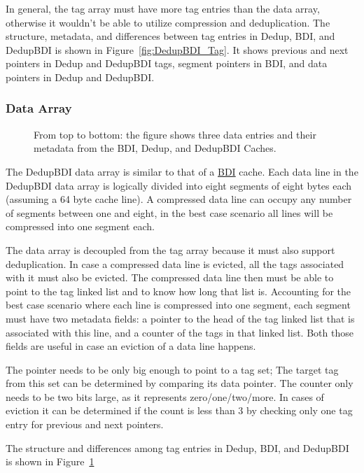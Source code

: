 In general, the tag array must have more tag entries than the data array, otherwise it wouldn't be able to utilize compression and deduplication. The structure, metadata, and differences between tag entries in Dedup, BDI, and DedupBDI is shown in Figure~\ref{fig:DedupBDI_Tag}. It shows previous and next pointers in Dedup and DedupBDI tags, segment pointers in BDI, and data pointers in Dedup and DedupBDI.
\subsubsection{Data Array}
\label{sssec:DedupBDIData}
\begin{figure}
    \caption[DedupBDI Data Array]{From top to bottom: the figure shows three data entries and their metadata from the BDI, Dedup, and DedupBDI Caches.}
    \label{fig:DedupBDI_Data}
\end{figure}
The DedupBDI data array is similar to that of a \hyperref[sssec:BDIData]{BDI} cache. Each data line in the DedupBDI data array is logically divided into eight segments of eight bytes each (assuming a 64 byte cache line). A compressed data line can occupy any number of segments between one and eight, in the best case scenario all lines will be compressed into one segment each.\par
The data array is decoupled from the tag array because it must also support deduplication. In case a compressed data line is evicted, all the tags associated with it must also be evicted. The compressed data line then must be able to point to the tag linked list and to know how long that list is. Accounting for the best case scenario where each line is compressed into one segment, each segment must have two metadata fields: a pointer to the head of the tag linked list that is associated with this line, and a counter of the tags in that linked list. Both those fields are useful in case an eviction of a data line happens.\par
The pointer needs to be only big enough to point to a tag set; The target tag from this set can be determined by comparing its data pointer. The counter only needs to be two bits large, as it represents zero/one/two/more. In cases of eviction it can be determined if the count is less than 3 by checking only one tag entry for previous and next pointers.\par
The structure and differences among tag entries in Dedup, BDI, and DedupBDI is shown in Figure~\ref{fig:DedupBDI_Data}
